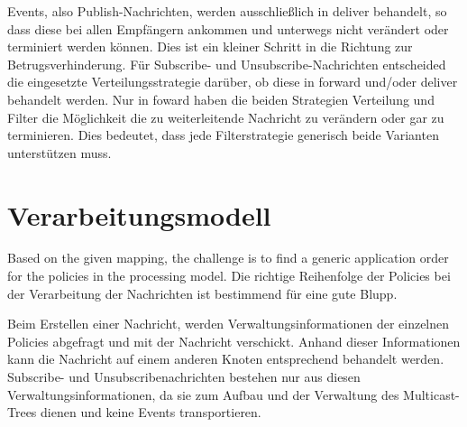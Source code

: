 \begin{table}[!h]
\caption{Verbindungsmatrix}
\label{tab:verbindungsmatrix}
\end{table}

Events, also Publish-Nachrichten, werden ausschließlich in deliver behandelt, so dass diese bei allen Empfängern ankommen und unterwegs nicht verändert oder terminiert werden können. Dies ist ein kleiner Schritt in die Richtung zur Betrugsverhinderung. Für Subscribe- und Unsubscribe-Nachrichten entscheided die eingesetzte Verteilungsstrategie darüber, ob diese in forward und/oder deliver behandelt werden. Nur in foward haben die beiden Strategien Verteilung und Filter die Möglichkeit die zu weiterleitende Nachricht zu verändern oder gar zu terminieren. Dies bedeutet, dass jede Filterstrategie generisch beide Varianten unterstützen muss.


\section{Verarbeitungsmodell}
Based on the given mapping, the challenge is to find a generic application order for the policies in the processing model.
Die richtige Reihenfolge der Policies bei der Verarbeitung der Nachrichten ist bestimmend für eine gute Blupp.

Beim Erstellen einer Nachricht, werden Verwaltungsinformationen der einzelnen Policies abgefragt und mit der Nachricht verschickt. Anhand dieser Informationen kann die Nachricht auf einem anderen Knoten entsprechend behandelt werden. Subscribe- und Unsubscribenachrichten bestehen nur aus diesen Verwaltungsinformationen, da sie zum Aufbau und der Verwaltung des Multicast-Trees dienen und keine Events transportieren.

